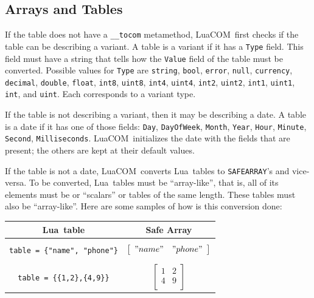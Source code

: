 \documentclass[11pt,a4paper,english]{report}
\newcommand{\ident}[1]{\mbox{\texttt{#1}}}
\newcommand{\techname}[1]{\mbox{#1}}
\newcommand{\lua}{\techname{Lua}}
\newcommand{\luacom}{\techname{LuaCOM}}
\begin{document}
\subsection{Arrays and Tables}

If the table does not have a \verb+__tocom+ metamethod,
\luacom\ first checks if the
table can be describing a variant. A table is a variant if it has a
\verb+Type+ field. This field must have a string that tells how the
\verb+Value+ field of the table must be converted. Possible values
for \verb+Type+ are \verb+string+, \verb+bool+, \verb+error+,
\verb+null+, \verb+currency+, \verb+decimal+, \verb+double+,
\verb+float+, \verb+int8+, \verb+uint8+, \verb+int4+, \verb+uint4+,
\verb+int2+, \verb+uint2+, \verb+int1+, \verb+uint1+, \verb+int+, and
\verb+uint+. Each corresponds to a variant type.

If the table is not describing a variant, then it may be describing
a date. A table is a date if it has one of those fields: \verb+Day+,
\verb+DayOfWeek+, \verb+Month+, \verb+Year+, \verb+Hour+,
\verb+Minute+, \verb+Second+, \verb+Milliseconds+. \luacom\
initializes the date with the fields that are present; the others
are kept at their default values.

If the table is not a date, \luacom\ converts \lua\ tables to \ident{SAFEARRAY}'s and
vice-versa. To be converted, \lua\ tables must be ``array-like'', that
is, all of its elements must be or ``scalars'' or tables of the same
length. These tables must also be ``array-like''. Here are some
samples of how is this conversion done:

\begin{center}
\begin{tabular}{|c|c|} \hline

\lua\ table & Safe Array \\ \hline \hline

\verb+table = {"name", "phone"}+  &
\begin{minipage}{5cm}
\begin{displaymath}
\left[\begin{array}{cc}
  "name"     & "phone"   \\
\end{array}\right]
\end{displaymath}
\end{minipage}
  \\ \hline

\verb+table = {{1,2},{4,9}}+          &
\begin{minipage}{5cm}
\begin{displaymath}
\left[\begin{array}{cc}
        1  & 2   \\
         4 & 9   \\
\end{array} \right]
\end{displaymath}
\end{minipage}
      \\ \hline
\end{tabular}
\end{center}
\end{document}
